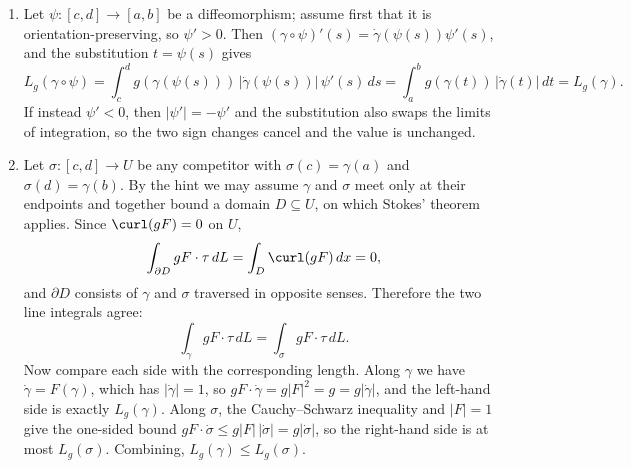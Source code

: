 \begin{exercisesolution}
\label{sol:poincare_geodesics_stokes}
\begin{enumerate}[label=\textbf{(\alph*)}]
  \item Let $\psi : [c,d] \to [a,b]$ be a diffeomorphism; assume first that it is
    orientation-preserving, so $\psi' > 0$. Then $(\gamma \circ \psi)'(s) = \dot\gamma(\psi(s))
    \psi'(s)$, and the substitution $t = \psi(s)$ gives
\[L_g(\gamma \circ \psi) = \int_c^d g(\gamma(\psi(s)))\,\lvert\dot\gamma(\psi(s))\rvert\,\psi'(s) \, ds = \int_a^b g(\gamma(t))\,\lvert\dot\gamma(t)\rvert \, dt = L_g(\gamma).\]
    If instead $\psi' < 0$, then $\lvert\psi'\rvert = -\psi'$ and the substitution also swaps the
    limits of integration, so the two sign changes cancel and the value is unchanged.

  \item Let $\sigma : [c,d] \to U$ be any competitor with $\sigma(c) = \gamma(a)$ and $\sigma(d) =
    \gamma(b)$. By the hint we may assume $\gamma$ and $\sigma$ meet only at their endpoints and
    together bound a domain $D \subseteq U$, on which Stokes' theorem applies. Since $\curl(gF) = 0$
    on $U$,
\[\int_{\partial D} gF \cdot \tau \, dL = \int_D \curl(gF) \, dx = 0,\]
    and $\partial D$ consists of $\gamma$ and $\sigma$ traversed in opposite senses. Therefore the
    two line integrals agree:
\[\int_\gamma gF \cdot \tau \, dL = \int_\sigma gF \cdot \tau \, dL.\]
    Now compare each side with the corresponding length. Along $\gamma$ we have $\dot\gamma = F(\gamma)$,
    which has $\lvert\dot\gamma\rvert = 1$, so $gF \cdot \dot\gamma = g\lvert F\rvert^2 = g =
    g\lvert\dot\gamma\rvert$, and the left-hand side is exactly $L_g(\gamma)$. Along $\sigma$, the
    Cauchy--Schwarz inequality and $\lvert F\rvert = 1$ give the one-sided bound
    $gF \cdot \dot\sigma \le g\lvert F\rvert\,\lvert\dot\sigma\rvert = g\lvert\dot\sigma\rvert$, so the
    right-hand side is at most $L_g(\sigma)$. Combining, $L_g(\gamma) \le L_g(\sigma)$.


\end{enumerate}
\end{exercisesolution}
